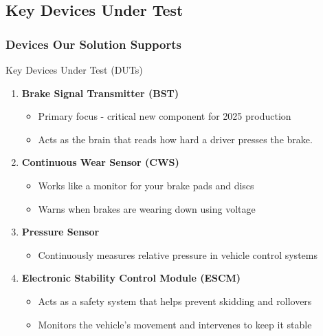 \documentclass[8pt,compress,aspectratio=169]{beamer}
\newcommand\DarkBold[1]{\textcolor{VSBlueDark}{\textbf{#1}}}
\begin{document}
\subsection{Key Devices Under Test}
\begin{frame}
    \frametitle{Devices Our Solution Supports}
    \begin{block}{Key Devices Under Test (DUTs)}
    \begin{enumerate}
        \item {\DarkBold{Brake Signal Transmitter (BST)}}
        \begin{itemize}
            \item Primary focus - critical new component for 2025 production
            \item Acts as the brain that reads how hard a driver presses the brake.
        \end{itemize}
        \item {\DarkBold{Continuous Wear Sensor (CWS)}}
        \begin{itemize}
            \item Works like a monitor for your brake pads and discs
            \item Warns when brakes are wearing down using voltage
        \end{itemize}
        \item {\DarkBold{Pressure Sensor}}
        \begin{itemize}
            \item Continuously measures relative pressure in vehicle control systems
        \end{itemize}
        \item {\DarkBold{Electronic Stability Control Module (ESCM)}}
            \begin{itemize}
                \item Acts as a safety system that helps prevent skidding and rollovers
                \item Monitors the vehicle's movement and intervenes to keep it stable
            \end{itemize}
    \end{enumerate}
  \end{block}
\end{frame}

\end{document}
